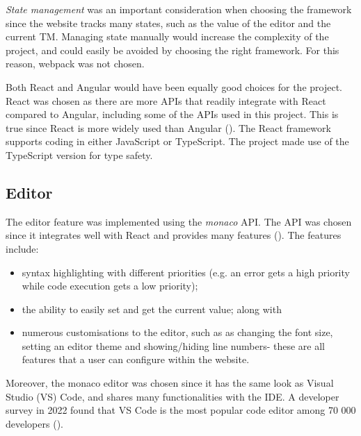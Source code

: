 \emph{State management} was an important consideration when choosing the framework since the website tracks many states, such as the value of the editor and the current TM. Managing state manually would increase the complexity of the project, and could easily be avoided by choosing the right framework. For this reason, webpack was not chosen.

Both React and Angular would have been equally good choices for the project. React was chosen as there are more APIs that readily integrate with React compared to Angular, including some of the APIs used in this project. This is true since React is more widely used than Angular (\cite{react_v_angular}). The React framework supports coding in either JavaScript or TypeScript. The project made use of the TypeScript version for type safety.

\subsection{Editor}

The editor feature was implemented using the \emph{monaco} API. The API was chosen since it integrates well with React and provides many features (\cite{monaco}). The features include:
\begin{itemize}
    \item syntax highlighting with different priorities (e.g. an error gets a high priority while code execution gets a low priority);
    \item the ability to easily set and get the current value; along with
    \item numerous customisations to the editor, such as as changing the font size, setting an editor theme and showing/hiding line numbers- these are all features that a user can configure within the website.
\end{itemize}
Moreover, the monaco editor was chosen since it has the same look as Visual Studio (VS) Code, and shares many functionalities with the IDE. A developer survey in 2022 found that VS Code is the most popular code editor among 70 000 developers (\cite{stack_overflow}).

